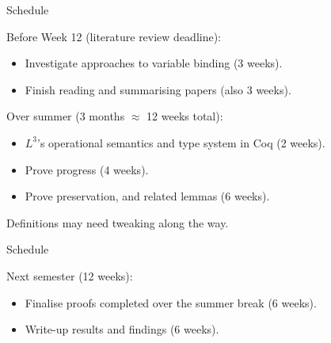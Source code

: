 \documentclass[10pt]{beamer}
\begin{document}
\begin{frame}{Schedule}

Before Week 12 (literature review deadline):

\begin{itemize}
\item Investigate approaches to variable binding (3 weeks).
\item Finish reading and summarising papers (also 3 weeks).
\end{itemize}

\pause

Over summer (3 months $\approx$ 12 weeks total):

\begin{itemize}
\item $L^3$'s operational semantics and type system in Coq (2 weeks).
\item Prove progress (4 weeks).
\item Prove preservation, and related lemmas (6 weeks).
\end{itemize}

Definitions may need tweaking along the way.
\end{frame}

\begin{frame}{Schedule}

Next semester (12 weeks):

\begin{itemize}
\item Finalise proofs completed over the summer break (6 weeks).
\item Write-up results and findings (6 weeks).
\end{itemize}

\end{frame}
\end{document}
